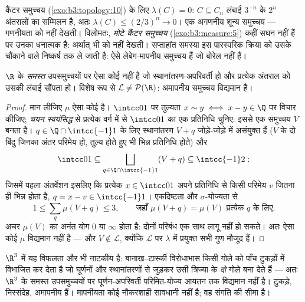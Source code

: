 \begin{example}\label{ex:b3:measure:cantor}
कैंटर समुच्चय (\cref{exo:b3:topology:10}) के लिए $\lambda(C) = 0$: $C \subseteq C_n$ लंबाई $3^{-n}$ के $2^n$
अंतरालों का सम्मिलन है, अतः $\lambda(C) \leq (2/3)^n \to 0$। एक अगणनीय शून्य समुच्चय ---
गणनीयता  को नहीं देखती। विलोमतः, \emph{मोटे कैंटर समुच्चय}
(\cref{exo:b3:measure:5}) कहीं सघन नहीं हैं पर उनका  धनात्मक है: अर्थात्
 भी  को नहीं देखती। सप्ताहांत समस्या इस पारस्परिक क्रिया
को उसके चौंकाने वाले निष्कर्ष तक ले जाती है: ऐसे लेबेग-मापनीय
समुच्चय हैं जो बोरेल नहीं हैं।
\end{example}

\begin{theorem}[विटाली]\label{thm:b3:measure:vitali}
$\R$ के \emph{समस्त} उपसमुच्चयों पर ऐसा कोई  नहीं है जो
स्थानांतरण-अपरिवर्ती हो और प्रत्येक अंतराल को उसकी लंबाई सौंपता
हो। विशेष रूप से $\mathcal L \neq \mathcal P(\R)$: अमापनीय समुच्चय विद्यमान
हैं।

\end{theorem}

\begin{proof}
मान लीजिए $\mu$ ऐसा कोई  है। $\intcc01$ पर तुल्यता $x \sim y \iff x - y \in \Q$ पर विचार
कीजिए; \emph{चयन स्वयंसिद्ध} से प्रत्येक वर्ग में से $\intcc01$ का एक
प्रतिनिधि चुनिए: इससे एक समुच्चय $V$ बनता है। $q \in \Q\cap\intcc{-1}1$ के लिए
स्थानांतरण $V + q$ जोड़े-जोड़े में असंयुक्त हैं ($V$ के दो बिंदु
जिनका अंतर परिमेय हो, तुल्य होते हुए भी भिन्न प्रतिनिधि होते) और
\[
\intcc01 \subseteq \bigsqcup_{q \in \Q\cap\intcc{-1}1}(V + q)
\subseteq \intcc{-1}2 :
\]
जिसमें पहला अंतर्वेशन इसलिए कि प्रत्येक $x \in \intcc01$ अपने प्रतिनिधि से
किसी परिमेय $v$ जितना ही भिन्न होता है, $q = x - v \in
\intcc{-1}1$। एकदिष्टता और
$\sigma$-योज्यता से
\[
1 \leq \sum_{q}\mu(V + q) \leq 3,
\qquad\text{जहाँ } \mu(V + q) = \mu(V) \text{ प्रत्येक } q \text{ के लिए} .
\]
अचर $\mu(V)$ का अनंत योग $0$ या $\infty$ होता है: दोनों परिबंध एक
साथ लागू नहीं हो सकते। अतः ऐसा कोई $\mu$ विद्यमान नहीं है ---
और $V
\notin \mathcal L$, क्योंकि $\mathcal L$ पर $\lambda$ में प्रयुक्त सभी गुण मौजूद हैं।
\end{proof}

\begin{remark}\label{rem:b3:measure:banachtarski}
$\R^3$ में यह विफलता और भी नाटकीय है: बानाख--टार्स्की विरोधाभास
किसी गोले को पाँच टुकड़ों में विभाजित कर देता है जो घूर्णनों और
स्थानांतरणों से जुड़कर उसी त्रिज्या के \emph{दो} गोले बना देते हैं
--- अतः $\R^3$ के समस्त उपसमुच्चयों पर घूर्णन-अपरिवर्ती परिमित-योज्य
आयतन तक विद्यमान नहीं है। टुकड़े, निस्संदेह, अमापनीय हैं। मापनीयता
कोई नौकरशाही सावधानी नहीं है; वह संगति की सीमा है।
\end{remark}

